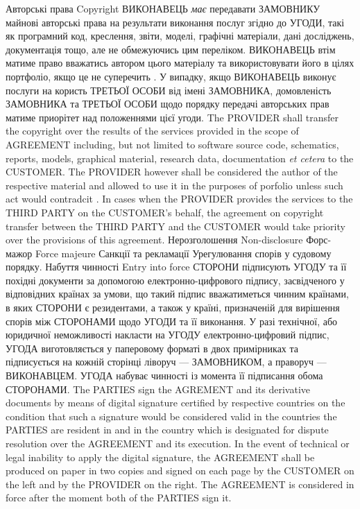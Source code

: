 \begin{Form}
\begin{paracol}{3}
      \clause
        {Авторські права}
        {Copyright}
        {}
        {ВИКОНАВЕЦЬ \textit{має} передавати ЗАМОВНИКУ майнові авторські права на результати виконання послуг згідно до УГОДИ, такі як програмний код, креслення, звіти, моделі, графічні матеріали, дані досліджень, документація тощо, але не обмежуючись цим переліком. ВИКОНАВЕЦЬ втім матиме право вважатись автором цього матеріалу та використовувати його в цілях портфоліо, якщо це не суперечить . У випадку, якщо ВИКОНАВЕЦЬ виконує послуги на користь ТРЕТЬОЇ ОСОБИ від імені ЗАМОВНИКА, домовленість ЗАМОВНИКА та ТРЕТЬОЇ ОСОБИ щодо порядку передачі авторських прав матиме приорітет над положеннями цієї угоди.}
        {The PROVIDER shall transfer the copyright over the results of the services provided in the scope of AGREEMENT including, but not limited to software source code, schematics, reports, models, graphical material, research data, documentation \emph{et ce\-te\-ra} to the CUSTOMER. The PROVIDER however shall be considered the author of the respective material and allowed to use it in the purposes of porfolio unless such act would contradcit . In cases when the PROVIDER provides the services to the THIRD PARTY on the CUSTOMER's behalf, the agreement on copyright transfer between the THIRD PARTY and the CUSTOMER would take priority over the provisions of this agreement.}
        {}
      \clause
        {Нерозголошення}
        {Non-disclosure}
        {}
        {\label{sec:nda}}
        {}
        {}
      \clause
        {Форс-мажор}
        {Force majeure}
        {}
        {\label{sec:nda}}
        {}
        {}
      \clause
        {Санкції та рекламації}
        {}
        {}
        {}
        {}
        {}
      \clause
        {Урегулювання спорів у судовому порядку.}
        {}
        {}
        {}
        {}
        {}
      \clause
        {Набуття чинності}
        {Entry into force}
        {}
        {СТОРОНИ підписують УГОДУ та її похідні документи за допомогою електронно-цифрового підпису, засвідченого у відповідних країнах за умови, що такий підпис вважатиметься чинним країнами, в яких СТОРОНИ є резидентами, а також у країні, призначеній для вирішення спорів між СТОРОНАМИ щодо УГОДИ та її виконання. У разі технічної, або юридичної неможливості накласти на УГОДУ електронно-цифровий підпис, УГОДА виготовляється у паперовому форматі в двох примірниках та підписується на кожній сторінці ліворуч — ЗАМОВНИКОМ, а праворуч — ВИКОНАВЦЕМ. УГОДА набуває чинності із момента її підписання обома СТОРОНАМИ.}
        {The PARTIES sign the AGREMENT and its derivative documents by means of digital signature certified by respective countries on the condition that such a signature would be considered valid in the countries the PARTIES are resident in and in the country which is designated for dispute resolution over the AGREEMENT and its execution. In the event of technical or legal inability to apply the digital signature, the AGREEMENT shall be produced on paper in two copies and signed on each page by the CUSTOMER on the left and by the PROVIDER on the right. The AGREEMENT is considered in force after the moment both of the PARTIES sign it.}
        {}


\end{paracol}
\end{Form}
